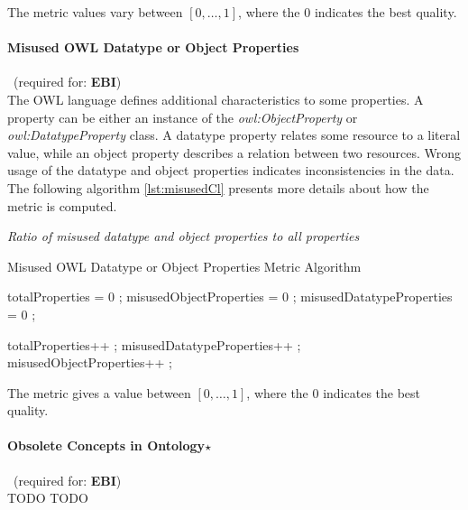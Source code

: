 The metric values vary between  $[0,\ldots,1]$, where  the 0 indicates the best quality.

\paragraph{Misused OWL Datatype or Object Properties}~(required for: \textbf{EBI})~\\
The OWL language defines additional characteristics to some properties. 
A property can be either an instance of the \textit{owl:ObjectProperty} or \textit{owl:DatatypeProperty} class.
A datatype property relates some resource to a literal value, while an object property describes a relation between two resources.
Wrong usage of the datatype and object properties indicates inconsistencies in the data.
The following algorithm  \ref{lst:misusedCl} presents more details about how the metric is computed.

\begin{mdframed}[style=metricdefinition]
\emph{Ratio of misused datatype and object properties to all properties}
\end{mdframed}

\begin{algorithm}
\caption{Misused OWL Datatype or Object Properties Metric Algorithm} \label{lst:misusedCl}
\begin{algorithmic}[1]
\State totalProperties = 0 ;
\State misusedObjectProperties = 0 ;
\State misusedDatatypeProperties = 0 ;
\EndProcedure

 totalProperties++ ;\EndIf 
{} misusedDatatypeProperties++ ; \EndIf 
{} misusedObjectProperties++ ; \EndIf 
\EndProcedure
\end{algorithmic}
\end{algorithm}

The metric gives a value between $[0,\ldots,1]$, where  the 0 indicates the best quality.

\paragraph{Obsolete Concepts in Ontology$\star$}~(required for: \textbf{EBI})~\\
TODO TODO

